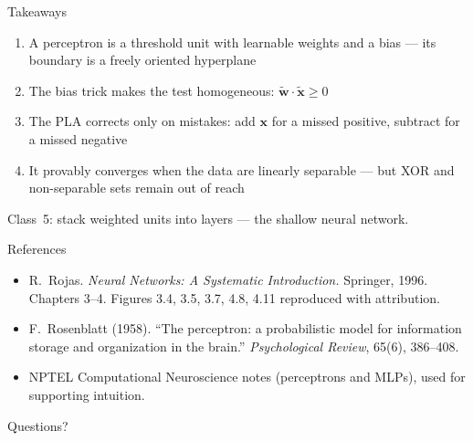 \documentclass[aspectratio=169, 11pt]{beamer}
\newcommand{\nosrc}{}       %
\begin{document}
\begin{frame}{Takeaways}
  \nosrc
  \begin{enumerate}\setlength{\itemsep}{2pt}
    \item A \alert{perceptron} is a threshold unit with
          \alert{learnable weights} and a \alert{bias} ---
          its boundary is a freely oriented hyperplane
    \item The bias trick makes the test homogeneous:
          $\tilde{\mathbf{w}}\!\cdot\!\tilde{\mathbf{x}}\ge 0$
    \item The \alert{PLA} corrects only on mistakes:
          add $\mathbf{x}$ for a missed positive, subtract
          for a missed negative
    \item It \alert{provably converges} when the data are
          linearly separable --- but XOR and non-separable
          sets remain out of reach
  \end{enumerate}
  \vspace{0.3em}
  \begin{redhighlight}
    Class~5: stack weighted units into layers --- the shallow
    neural network.
  \end{redhighlight}
\end{frame}

\begin{frame}{References}
  \nosrc
  \footnotesize
  \begin{itemize}
    \item R.~Rojas. \textit{Neural Networks: A Systematic
          Introduction.} Springer, 1996. Chapters 3--4.
          Figures 3.4, 3.5, 3.7, 4.8, 4.11 reproduced with
          attribution.
    \item F.~Rosenblatt (1958). ``The perceptron: a
          probabilistic model for information storage and
          organization in the brain.'' \textit{Psychological
          Review}, 65(6), 386--408.
    \item NPTEL Computational Neuroscience notes
          (perceptrons and MLPs), used for supporting
          intuition.
  \end{itemize}
\end{frame}

\begin{frame}[standout]
  \nosrc
  Questions?
\end{frame}
\end{document}
